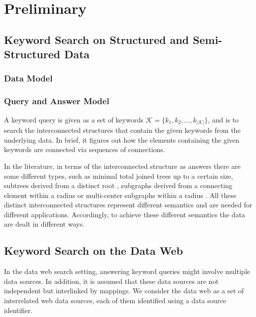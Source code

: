 \chapter{Preliminary}\label{pre}

\section{Keyword Search on Structured and Semi-Structured Data}

\subsection{Data Model} 

\subsection{Query and Answer Model}
A keyword query is given as a set of keywords $\mathcal{K} =
\{k_1,k_2,\ldots,k_{\left\vert\mathcal{K}\right\vert}\}$, and is to search the interconnected
structures that contain the given keywords from the underlying data. In brief, it figures out how the
elements containing the given keywords are connected via sequences of connections.

In the literature, in terms of the interconnected structure as answers there are some different
types, such as minimal total joined trees up to a certain size\citep{DBLP:conf/icde/AgrawalCD02,
DBLP:conf/vldb/HristidisP02, DBLP:conf/vldb/HristidisGP03, DBLP:conf/sigmod/LiuYMC06,
DBLP:conf/sigmod/LuoLWZ07, DBLP:conf/icde/SayyadianLDG07}, subtrees derived from a distinct root
\citep{DBLP:conf/icde/BhalotiaHNCS02, DBLP:conf/vldb/KacholiaPCSDK05, DBLP:conf/sigmod/HeWYY07},
subgraphs derived from a connecting element within a radius \citep{DBLP:conf/icde/TranWRC09} or
multi-center subgraphs within a radius \citep{DBLP:conf/icde/QinYCT09}. All these distinct
interconnected structures represent different semantics and are needed for different applications.
Accordingly, to achieve these different semantics the data are dealt in different ways.

\section{Keyword Search on the Data Web}
In the data web search setting, answering keyword queries might involve multiple data sources. In
addition, it is assumed that these data sources are not independent but interlinked by mappings. We
consider the data web as a set of interrelated web data sources, each of them identified using a data
source identifier.




